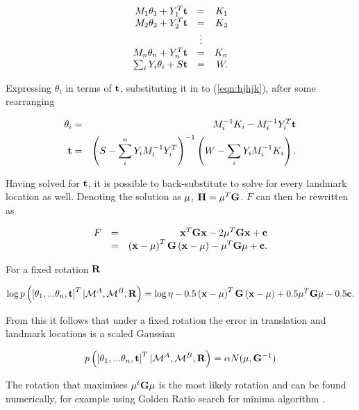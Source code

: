 \begin{equation}
\begin{array}{rcr}
M_1\theta_1 + Y_1^T{\bf t} &=& K_1\\
M_2\theta_2 + Y_2^T{\bf t} &=& K_2\\
&\vdots&\\
M_n\theta_n + Y_n^T{\bf t} &=& K_n\\
\sum_i Y_i\theta_i + S{\bf t} &=& W.
\end{array}
\label{eqn:hjhjk}
\end{equation}

Expressing $\theta_i$ in terms of ${\bf t}$, substituting it in to
(\ref{eqn:hjhjk}), after some rearranging 

\begin{eqnarray}
\theta_i &=& M_i^{-1}K_i - M_i^{-1}Y_i^T{\bf t}\\
{\bf t} &=& \left( S -\sum_i^n Y_iM_i^{-1}Y_i^T \right)^{-1}
\left(W - \sum_i Y_iM_i^{-1}K_i \right).
\end{eqnarray}

Having solved for ${\bf t}$, it is possible to back-substitute to
solve for every landmark location as well. Denoting the solution as
${\bf \mu}$, ${\bf H}={\bf \mu}^T{\bf G}$. $F$ can then be rewritten
as

\begin{equation}
\begin{array}{rcr}
F &=& {\bf x}^T{\bf Gx} - 2{\bf \mu}^T{\bf Gx} + {\bf c}\\
 &=& \left({\bf x - \mu}\right)^T{\bf G}\left( {\bf x - \mu} \right) -
{\bf \mu}^T{\bf G\mu} + {\bf c}.
\end{array}
\end{equation}

For a fixed rotation ${\bf R}$ 

$$
\log p\left(\left[\theta_1, ...\theta_n,{\bf t} \right]^T | 
\mapA, \mapB,{\bf R} \right) =
\log \eta -0.5\left({\bf x - \mu}\right)^T{\bf G}\left( {\bf x - \mu} \right) +
0.5{\bf \mu}^T{\bf G\mu} -0.5 {\bf c}.
$$

From this it follows that under a fixed rotation the error in
translation and landmark locations is a scaled Gaussian

$$
p\left(\left[\theta_1, ...\theta_n,{\bf t}\right]^T | 
\mapA,\mapB,{\bf R}\right) 
= \alpha N({\bf \mu}, {\bf G}^{-1})
$$

The rotation that maximises $\mu^t{\bf G}\mu$ is the most likely
rotation and can be found numerically, for example using Golden Ratio
search for minima algorithm \cite{Pres92}.


